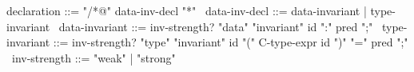 \begin{syntax}
  declaration ::= "/*@" data-inv-decl "*" 
  \
  data-inv-decl ::= data-invariant | type-invariant
  \
  data-invariant ::= inv-strength? "data" "invariant" id ":" pred ";"
  \
  type-invariant ::= inv-strength? "type" "invariant" id "(" C-type-expr id ")" "=" pred ";"
  \
  inv-strength ::= "weak" | "strong"
\end{syntax}
